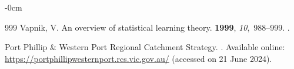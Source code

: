 \documentclass[jmse,article,accept,pdftex,oneauthor]{Definitions/mdpi}
\begin{document}
\begin{adjustwidth}{-\extralength}{0cm}
\begin{thebibliography}{999}
Vapnik, V.
\newblock An overview of statistical learning theory.
 {\bf 1999}, {\em
  10},~988--999.
.

{Port Phillip \& Western Port Regional Catchment Strategy}.
.
\newblock Available online: \url{https://portphillipwesternport.rcs.vic.gov.au/} %
  (accessed on 21 June 2024).

\end{thebibliography}
\PublishersNote{}

\end{adjustwidth}
\end{document}
